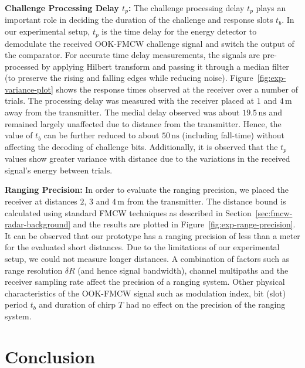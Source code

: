\documentclass{sig-alternate-10pt}
\newcommand{\unit}[1]{\ensuremath{\, \mathrm{#1}}}
\begin{document}
\textbf{Challenge Processing Delay $t_p$:} The challenge processing delay $t_p$
plays an important role in deciding the duration of the challenge and response
slots $t_b$. In our experimental setup, $t_p$ is the time delay for the energy
detector to demodulate the received OOK-FMCW challenge signal and switch the
output of the comparator. For accurate time delay measurements, the signals are
pre-processed by applying Hilbert transform and passing it through a median
filter (to preserve the rising and falling edges while reducing noise).
Figure~\ref{fig:exp-variance-plot} shows the response times observed at the
receiver over a number of trials. The processing delay was measured with the
receiver placed at $1$ and $4\unit{m}$ away from the transmitter. The medial
delay observed was about $19.5\unit{ns}$ and remained largely unaffected due to
distance from the transmitter. Hence, the value of $t_b$ can be further reduced
to about $50\unit{ns}$ (including fall-time) without affecting the decoding of
challenge bits. Additionally, it is observed that the $t_p$ values show greater
variance with distance due to the variations in the received signal's energy
between trials.

\textbf{Ranging Precision:} In order to evaluate the ranging precision, we
placed the receiver at distances $2$, $3$ and $4\unit{m}$ from the transmitter.
The distance bound is calculated using standard FMCW techniques as described in
Section~\ref{sec:fmcw-radar-background} and the results are plotted in
Figure~\ref{fig:exp-range-precision}. It can be observed that our prototype has
a ranging precision of less than a meter for the evaluated short distances. Due
to the limitations of our experimental setup, we could not measure longer
distances. A combination of factors such as range resolution $\delta R$ (and
hence signal bandwidth), channel multipaths and the receiver sampling rate
affect the precision of a ranging system. Other physical characteristics of the
OOK-FMCW signal such as modulation index, bit (slot) period $t_b$ and duration
of chirp $T$ had no effect on the precision of the ranging system.

\section{Conclusion}
\label{sec:conclusion}
\end{document}
